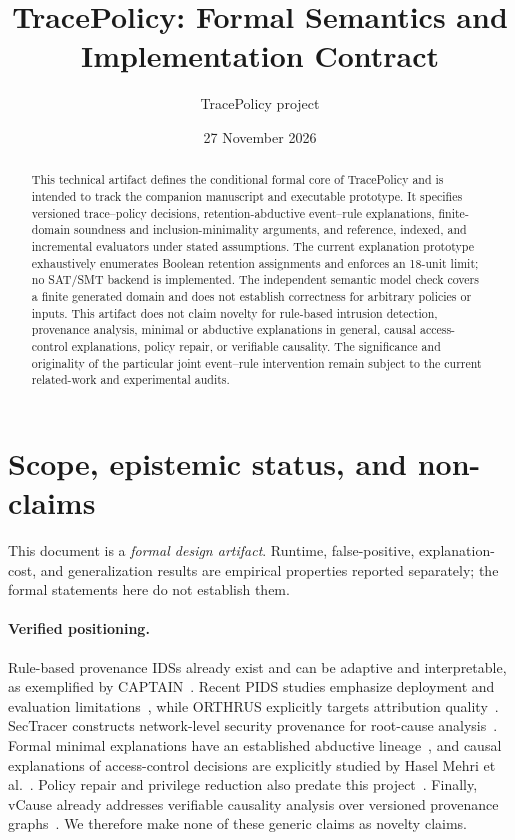 \documentclass[11pt]{article}
\title{TracePolicy: Formal Semantics and Implementation Contract}
\author{TracePolicy project}
\date{27 November 2026}
\theoremstyle{remark}
\begin{document}
\maketitle

\begin{abstract}
This technical artifact defines the conditional formal core of TracePolicy and is intended to track the companion manuscript and executable prototype. It specifies versioned trace--policy decisions, retention-abductive event--rule explanations, finite-domain soundness and inclusion-minimality arguments, and reference, indexed, and incremental evaluators under stated assumptions. The current explanation prototype exhaustively enumerates Boolean retention assignments and enforces an 18-unit limit; no SAT/SMT backend is implemented. The independent semantic model check covers a finite generated domain and does not establish correctness for arbitrary policies or inputs. This artifact does not claim novelty for rule-based intrusion detection, provenance analysis, minimal or abductive explanations in general, causal access-control explanations, policy repair, or verifiable causality. The significance and originality of the particular joint event--rule intervention remain subject to the current related-work and experimental audits.
\end{abstract}

\section{Scope, epistemic status, and non-claims}

This document is a \emph{formal design artifact}. Runtime, false-positive, explanation-cost, and generalization results are empirical properties reported separately; the formal statements here do not establish them.

\paragraph{Verified positioning.}
Rule-based provenance IDSs already exist and can be adaptive and interpretable, as exemplified by CAPTAIN~\citep{Wang2025_r57}. Recent PIDS studies emphasize deployment and evaluation limitations~\citep{Bilot2025_r55}, while ORTHRUS explicitly targets attribution quality~\citep{Jiang2025_r54}. SecTracer constructs network-level security provenance for root-cause analysis~\citep{Lee2026_r58}. Formal minimal explanations have an established abductive lineage~\citep{Ignatiev2019_r29,MarquesSilvaHuang2024}, and causal explanations of access-control decisions are explicitly studied by Hasel Mehri et al.~\citep{HaselMehri2026Causal}. Policy repair and privilege reduction also predate this project~\citep{Eiers2023Repair,DAntoni2024Privilege}. Finally, vCause already addresses verifiable causality analysis over versioned provenance graphs~\citep{Song2026VCause}. We therefore make none of these generic claims as novelty claims.
\end{document}
